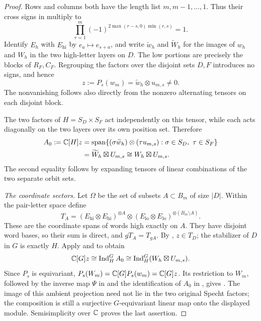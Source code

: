 \begin{proof}
Rows and columns both have the length list $m,m-1,\ldots,1$.
Thus their cross signs in  multiply to
\[
 \prod_{r=1}^m(-1)^{2\max(r-s,0)\min(r,s)}=1.
\]
Identify $E_h$ with $E_{\mathrm{hi}}$ by
$e_a\mapsto e_{s+a}$, and write $\widetilde w_h$ and
$\widetilde W_h$ for the images of $w_h$ and $W_h$ in the two
high-letter layers on $D$.  The low portions are precisely the blocks
of $R_F,C_F$.  Regrouping the factors over the disjoint sets $D,F$
introduces no signs, and hence
\begin{equation}\label{band:generator-factorization}
 z:=P_s(w_m)=\widetilde w_h\otimes u_{m,s}\ne0.
\end{equation}
The nonvanishing follows also directly from the nonzero alternating
tensors on each disjoint block.

The two factors of $H=S_D\times S_F$ act independently on this
tensor, while each acts diagonally on the two layers over its own
position set.  Therefore
\begin{align}
 A_0:=\mathbb C[H]z
 &=\operatorname{span}\{(\sigma\widetilde w_h)\otimes(\tau u_{m,s}):
             \sigma\in S_D,\ \tau\in S_F\}\notag\\
 &=\widetilde W_h\boxtimes U_{m,s}
 \cong W_h\boxtimes U_{m,s}.
 \label{band:subgroup-orbit}
\end{align}
The second equality follows by expanding tensors of linear
combinations of the two separate orbit sets.

\emph{The coordinate sectors.}
Let $\Omega$ be the set of subsets $A\subset B_m$ of size $|D|$.
Within the pair-letter space define
\[
 T_A=(E_{\mathrm{hi}}\otimes E_{\mathrm{hi}})^{\otimes A}
       \otimes
       (E_{\mathrm{lo}}\otimes E_{\mathrm{lo}})^{\otimes(B_m\setminus A)}.
\]
These are the coordinate spans of words high exactly on $A$.
They have disjoint word bases, so their sum is direct, and
$gT_A=T_{gA}$.  By , $z\in T_D$;
the stabilizer of $D$ in $G$ is exactly $H$.
Apply  and
 to obtain
\[
 \mathbb C[G]z\cong\operatorname{Ind}_H^G A_0
       \cong\operatorname{Ind}_H^G(W_h\boxtimes U_{m,s}).
\]
Since $P_s$ is equivariant, $P_s(W_m)=\mathbb C[G]P_s(w_m)=\mathbb C[G]z$.
Its restriction to $W_m$, followed by the inverse map $\Psi$ in
 and the identification of $A_0$ in
, gives .
The image of this ambient projection need not lie in the two original
Specht factors; the composition is still a surjective $G$-equivariant
linear map onto
the displayed module.  Semisimplicity over $\mathbb C$ proves the last
assertion.
\end{proof}
